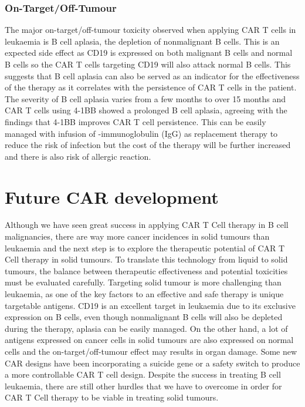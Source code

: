 \documentclass[12pt,oneside]{report}
\begin{document}
\subsubsection{On-Target/Off-Tumour}
The major on-target/off-tumour toxicity observed when applying CAR T cells in leukaemia is B cell aplasia, the depletion of nonmalignant B cells. This is an expected side effect as CD19 is expressed on both malignant B cells and normal B cells so the CAR T cells targeting CD19 will also attack normal B cells. This suggests that B cell aplasia can also be served as an indicator for the effectiveness of the therapy as it correlates with the persistence of CAR T cells in the patient. The severity of B cell aplasia varies from a few months\citep{ALL2, aplasia} to over 15 months\citep{aplasia-3} and CAR T cells using 4-1BB showed a prolonged B cell aplasia\citep{aplasia-2, aplasia-3}, agreeing with the findings that 4-1BB improves CAR T cell persistence. This can be easily managed with infusion of \textgamma -immunoglobulin (IgG) as replacement therapy\citep{ALL2, aplasia-4, aplasia-5} to reduce the risk of infection but the cost of the therapy will be further increased and there is also risk of allergic reaction.

\section{Future CAR development}
Although we have seen great success in applying CAR T Cell therapy in B cell malignancies, there are way more cancer incidences in solid tumours than leukaemia\citep{CRUK} and the next step is to explore the therapeutic potential of CAR T Cell therapy in solid tumours. To translate this technology from liquid to solid tumours, the balance between therapeutic effectiveness and potential toxicities must be evaluated carefully. Targeting solid tumour is more challenging than leukaemia, as one of the key factors to an effective and safe therapy is unique targetable antigens. CD19 is an excellent target in leukaemia due to its exclusive expression on B cells, even though nonmalignant B cells will also be depleted during the therapy, aplasia can be easily managed. On the other hand, a lot of antigens expressed on cancer cells in solid tumours are also expressed on normal cells and the on-target/off-tumour effect may results in organ damage. Some new CAR designs have been incorporating a suicide gene or a safety switch\citep{blueprints} to produce a more controllable CAR T cell design. Despite the success in treating B cell leukaemia, there are still other hurdles that we have to overcome in order for CAR T Cell therapy to be viable in treating solid tumours.
\end{document}
